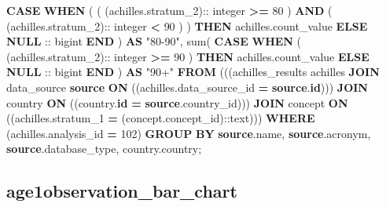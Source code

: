 \documentclass[
]{book}
\newenvironment{Shaded}{\begin{snugshade}}{\end{snugshade}}
\newcommand{\CharTok}[1]{\textcolor[rgb]{0.31,0.60,0.02}{#1}}
\newcommand{\ControlFlowTok}[1]{\textcolor[rgb]{0.13,0.29,0.53}{\textbf{#1}}}
\newcommand{\DataTypeTok}[1]{\textcolor[rgb]{0.13,0.29,0.53}{#1}}
\newcommand{\DecValTok}[1]{\textcolor[rgb]{0.00,0.00,0.81}{#1}}
\newcommand{\FunctionTok}[1]{\textcolor[rgb]{0.00,0.00,0.00}{#1}}
\newcommand{\KeywordTok}[1]{\textcolor[rgb]{0.13,0.29,0.53}{\textbf{#1}}}
\newcommand{\NormalTok}[1]{#1}
\newcommand{\OperatorTok}[1]{\textcolor[rgb]{0.81,0.36,0.00}{\textbf{#1}}}
\newcommand{\OtherTok}[1]{\textcolor[rgb]{0.56,0.35,0.01}{#1}}
\begin{document}
\begin{Shaded}
\begin{Highlighting}[]
     \ControlFlowTok{CASE} \ControlFlowTok{WHEN}\NormalTok{ (}
\NormalTok{       (}
\NormalTok{         (achilles.stratum\_2):: }\DataTypeTok{integer} \OperatorTok{\textgreater{}=} \DecValTok{80}
\NormalTok{       ) }
       \KeywordTok{AND}\NormalTok{ (}
\NormalTok{         (achilles.stratum\_2):: }\DataTypeTok{integer} \OperatorTok{\textless{}} \DecValTok{90}
\NormalTok{       )}
\NormalTok{     ) }\ControlFlowTok{THEN}\NormalTok{ achilles.count\_value }\ControlFlowTok{ELSE} \KeywordTok{NULL}\NormalTok{ :: bigint }\ControlFlowTok{END}
\NormalTok{   ) }\KeywordTok{AS} \OtherTok{"80{-}90"}\NormalTok{, }
   \FunctionTok{sum}\NormalTok{(}
     \ControlFlowTok{CASE} \ControlFlowTok{WHEN}\NormalTok{ (}
\NormalTok{       (achilles.stratum\_2):: }\DataTypeTok{integer} \OperatorTok{\textgreater{}=} \DecValTok{90}
\NormalTok{     ) }\ControlFlowTok{THEN}\NormalTok{ achilles.count\_value }\ControlFlowTok{ELSE} \KeywordTok{NULL}\NormalTok{ :: bigint }\ControlFlowTok{END}
\NormalTok{   ) }\KeywordTok{AS} \OtherTok{"90+"} 
  \KeywordTok{FROM}\NormalTok{ (((achilles\_results achilles}
    \KeywordTok{JOIN}\NormalTok{ data\_source }\KeywordTok{source}
      \KeywordTok{ON}\NormalTok{ ((achilles.data\_source\_id }\OperatorTok{=} \KeywordTok{source}\NormalTok{.}\KeywordTok{id}\NormalTok{)))}
    \KeywordTok{JOIN}\NormalTok{ country }\KeywordTok{ON}\NormalTok{ ((country.}\KeywordTok{id} \OperatorTok{=} \KeywordTok{source}\NormalTok{.country\_id)))}
    \KeywordTok{JOIN}\NormalTok{ concept}
      \KeywordTok{ON}\NormalTok{ ((achilles.stratum\_1 }\OperatorTok{=}\NormalTok{ (concept.concept\_id):}\CharTok{:text}\NormalTok{)))}
 \KeywordTok{WHERE}\NormalTok{ (achilles.analysis\_id }\OperatorTok{=} \DecValTok{102}\NormalTok{)}
 \KeywordTok{GROUP} \KeywordTok{BY} 
   \KeywordTok{source}\NormalTok{.name, }
   \KeywordTok{source}\NormalTok{.acronym, }
   \KeywordTok{source}\NormalTok{.database\_type, }
\NormalTok{   country.country;}
\end{Highlighting}
\end{Shaded}

\hypertarget{age1observation_bar_chart}{%
\subsection*{age1observation\_bar\_chart}\label{age1observation_bar_chart}}
\end{document}
